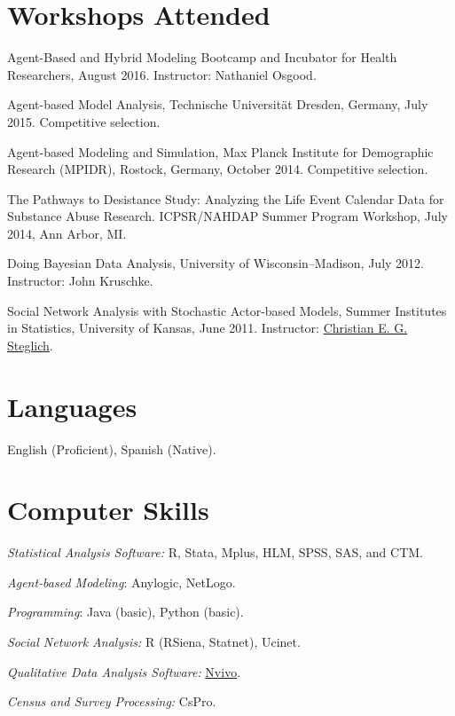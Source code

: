 \documentclass[10pt,letterpaper]{article}
\renewenvironment{itemize}{
  \begin{list}{}{
    \setlength{\leftmargin}{1.5em}
    \setlength{\itemsep}{0.25em}
    \setlength{\parskip}{0pt}
    \setlength{\parsep}{0.25em}
  }
}{
  \end{list}
}
\begin{document}
\section*{Workshops Attended}

\begin{itemize}

\item Agent-Based and Hybrid Modeling Bootcamp and Incubator for Health Researchers, August 2016. Instructor: Nathaniel Osgood.
\item Agent-based Model Analysis, Technische Universität Dresden, Germany, July 2015. Competitive selection.
\item Agent-based Modeling and Simulation, Max Planck Institute for Demographic Research (MPIDR), Rostock, Germany, October 2014. Competitive selection.
\item The Pathways to Desistance Study: Analyzing the Life Event Calendar Data for Substance Abuse Research. ICPSR/NAHDAP Summer Program Workshop, July 2014, Ann Arbor, MI.
\item Doing Bayesian Data Analysis, University of Wisconsin--Madison, July 2012. Instructor: John Kruschke.
\item Social Network Analysis with Stochastic Actor-based Models, Summer Institutes in Statistics,  University of Kansas, June 2011. Instructor: \href{http://www.ppsw.rug.nl/~steglich/sites/index.htm}{Christian E. G. Steglich}.

 \end{itemize}

\section*{Languages}

\begin{itemize}
\item English (Proficient), Spanish (Native).
\end{itemize}

\section*{Computer Skills}

\begin{itemize}
\item \textit{Statistical Analysis Software:} R, Stata, Mplus, HLM, SPSS, SAS, and CTM.
\item \textit{Agent-based Modeling}: Anylogic, NetLogo.
\item \textit{Programming}: Java (basic), Python (basic).
\item \textit{Social Network Analysis:} R (RSiena, Statnet), Ucinet.
\item \textit{Qualitative Data Analysis Software:} \href{http://www.qsrinternational.com/}{Nvivo}.
\item \textit{Census and Survey Processing:} CsPro.
\end{itemize}
\end{document}
